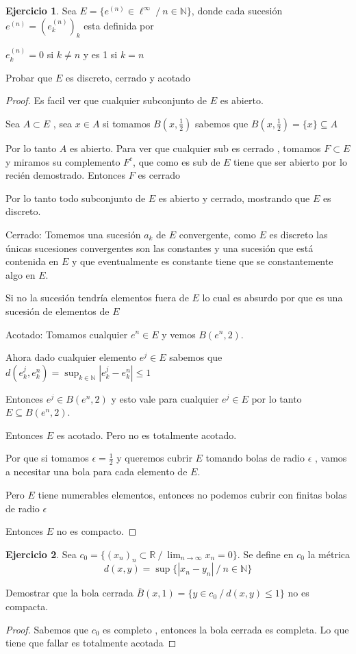 \documentclass[11pt]{report}
\newcommand{\R}{\mathbb{R}}
\newcommand{\N}{\mathbb{N}}
\newcommand{\ra}{\rightarrow}
\newcommand{\ol}{\overline}
\theoremstyle{definition}
\newtheorem{ej}{Ejercicio}
\begin{document}
	\begin{ej}
		Sea $E = \{e^{(n)} \in \ell^{\infty} \  / \ n \in \N\}$, donde cada sucesión $e^{(n)} = (e_k^{(n)})_k$ esta definida por 

		$e_k^{(n)} = 0$ si $k \neq n$ y es 1 si $k = n$

		Probar que $E$ es discreto, cerrado y acotado

		\begin{proof}
			Es facil ver que cualquier subconjunto de $E$ es abierto.

			Sea $A \subset E$ , sea $x \in A$ si tomamos $B(x,\frac{1}{2}) $ sabemos que $B(x,\frac{1}{2}) = \{x\} \subseteq A$

			Por lo tanto $A$ es abierto. Para ver que cualquier sub es cerrado , tomamos $F \subset E$ y miramos su complemento $F^c$, que como es sub de $E$ tiene que ser abierto por lo recién demostrado. Entonces $F$ es cerrado

			Por lo tanto todo subconjunto de $E$ es abierto y cerrado, mostrando que $E$ es discreto.

			Cerrado: Tomemos una sucesión $a_k$ de $E$ convergente, como $E$ es discreto las únicas sucesiones convergentes son las constantes y una sucesión que está contenida en $E$ y que eventualmente es constante tiene que se constantemente algo en $E$.

			Si no la sucesión tendría elementos fuera de $E$ lo cual es absurdo por que es una sucesión de elementos de $E$

			Acotado: Tomamos cualquier $e^n \in E$ y vemos $B(e^n,2)$.

			Ahora dado cualquier elemento $e^j \in E$ sabemos que $d(e^j_k,e^n_k) = \sup_{k \in \N}|e^j_k - e^n_k| \leq 1$

			Entonces $e^j \in B(e^n,2)$ y esto vale para cualquier $e^j\in E$ por lo tanto $E \subseteq B(e^n,2)$. 

			Entonces $E$ es acotado. Pero no es totalmente acotado.

			Por que si tomamos $\epsilon = \frac{1}{2}$ y queremos cubrir $E$ tomando bolas de radio $\epsilon$ , vamos a necesitar una bola para cada elemento de $E$. 

			Pero $E$ tiene numerables elementos, entonces no podemos cubrir con finitas bolas de radio $\epsilon$

			Entonces $E$ no es compacto.
		\end{proof}
	\end{ej}
	
	\begin{ej}
		Sea $c_0 = \{(x_n)_n\subset \R \ / \ \lim_{n\ra\infty} x_n = 0\}$. Se define en $c_0$ la métrica
		$$ d(x,y) = \sup\{|x_n - y_n| \ / \ n \in \N\}$$

		Demostrar que la bola cerrada $\ol B (x,1) = \{y \in c_0 \ / \ d(x,y) \leq 1\}$ no es compacta.

		\begin{proof}
			Sabemos que $c_0$ es completo , entonces la bola cerrada es completa. Lo que tiene que fallar es totalmente acotada
		\end{proof}
	\end{ej}
\end{document}
